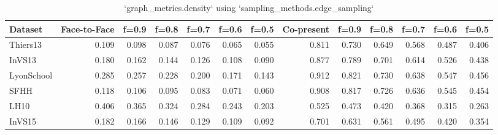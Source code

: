 \begin{table}[ht]
\begin{tabular}{lrrrrrrrrrrrr}
\hline
 Dataset    &   Face-to-Face &   f=0.9 &   f=0.8 &   f=0.7 &   f=0.6 &   f=0.5 &   Co-present &   f=0.9 &   f=0.8 &   f=0.7 &   f=0.6 &   f=0.5 \\
\hline
 Thiers13   &          0.109 &   0.098 &   0.087 &   0.076 &   0.065 &   0.055 &        0.811 &   0.730 &   0.649 &   0.568 &   0.487 &   0.406 \\
 InVS13     &          0.180 &   0.162 &   0.144 &   0.126 &   0.108 &   0.090 &        0.877 &   0.789 &   0.701 &   0.614 &   0.526 &   0.438 \\
 LyonSchool &          0.285 &   0.257 &   0.228 &   0.200 &   0.171 &   0.143 &        0.912 &   0.821 &   0.730 &   0.638 &   0.547 &   0.456 \\
 SFHH       &          0.118 &   0.106 &   0.095 &   0.083 &   0.071 &   0.060 &        0.908 &   0.817 &   0.726 &   0.636 &   0.545 &   0.454 \\
 LH10       &          0.406 &   0.365 &   0.324 &   0.284 &   0.243 &   0.203 &        0.525 &   0.473 &   0.420 &   0.368 &   0.315 &   0.263 \\
 InVS15     &          0.182 &   0.166 &   0.146 &   0.129 &   0.109 &   0.092 &        0.701 &   0.631 &   0.561 &   0.495 &   0.420 &   0.354 \\
\hline
\end{tabular}
\caption{`graph_metrics.density` using `sampling_methods.edge_sampling`}
\end{table}